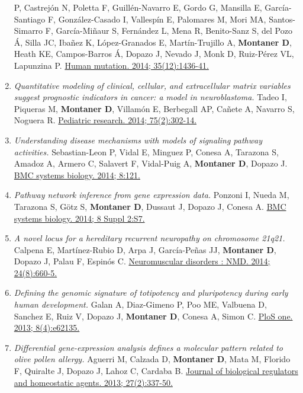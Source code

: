 \begin{enumerate}
  P, Castrejón N, Poletta F, Guillén-Navarro E, Gordo G, Mansilla E,
  García-Santiago F, González-Casado I, Vallespín E, Palomares M, Mori
  MA, Santos-Simarro F, García-Miñaur S, Fernández L, Mena R,
  Benito-Sanz S, del Pozo Á, Silla JC, Ibañez K, López-Granados E,
  Martín-Trujillo A, \textbf{Montaner D}, Heath KE, Campos-Barros Á,
  Dopazo J, Nevado J, Monk D, Ruiz-Pérez VL, Lapunzina P.
  \href{http://www.ncbi.nlm.nih.gov//pubmed/25196541}{Human mutation.
  2014; 35(12):1436-41.}
\item
  \emph{Quantitative modeling of clinical, cellular, and extracellular
  matrix variables suggest prognostic indicators in cancer: a model in
  neuroblastoma.} Tadeo I, Piqueras M, \textbf{Montaner D}, Villamón E,
  Berbegall AP, Cañete A, Navarro S, Noguera R.
  \href{http://www.ncbi.nlm.nih.gov//pubmed/24216542}{Pediatric
  research. 2014; 75(2):302-14.}
\item
  \emph{Understanding disease mechanisms with models of signaling
  pathway activities.} Sebastian-Leon P, Vidal E, Minguez P, Conesa A,
  Tarazona S, Amadoz A, Armero C, Salavert F, Vidal-Puig A,
  \textbf{Montaner D}, Dopazo J.
  \href{http://www.ncbi.nlm.nih.gov//pubmed/25344409}{BMC systems
  biology. 2014; 8:121.}
\item
  \emph{Pathway network inference from gene expression data.} Ponzoni I,
  Nueda M, Tarazona S, Götz S, \textbf{Montaner D}, Dussaut J, Dopazo J,
  Conesa A. \href{http://www.ncbi.nlm.nih.gov//pubmed/25032889}{BMC
  systems biology. 2014; 8 Suppl 2:S7.}
\item
  \emph{A novel locus for a hereditary recurrent neuropathy on
  chromosome 21q21.} Calpena E, Martínez-Rubio D, Arpa J, García-Peñas
  JJ, \textbf{Montaner D}, Dopazo J, Palau F, Espinós C.
  \href{http://www.ncbi.nlm.nih.gov//pubmed/24878226}{Neuromuscular
  disorders : NMD. 2014; 24(8):660-5.}
\item
  \emph{Defining the genomic signature of totipotency and pluripotency
  during early human development.} Galan A, Diaz-Gimeno P, Poo ME,
  Valbuena D, Sanchez E, Ruiz V, Dopazo J, \textbf{Montaner D}, Conesa
  A, Simon C. \href{http://www.ncbi.nlm.nih.gov//pubmed/23614026}{PloS
  one. 2013; 8(4):e62135.}
\item
  \emph{Differential gene-expression analysis defines a molecular
  pattern related to olive pollen allergy.} Aguerri M, Calzada D,
  \textbf{Montaner D}, Mata M, Florido F, Quiralte J, Dopazo J, Lahoz C,
  Cardaba B. \href{http://www.ncbi.nlm.nih.gov//pubmed/23830385}{Journal
  of biological regulators and homeostatic agents. 2013; 27(2):337-50.}

\end{enumerate}
